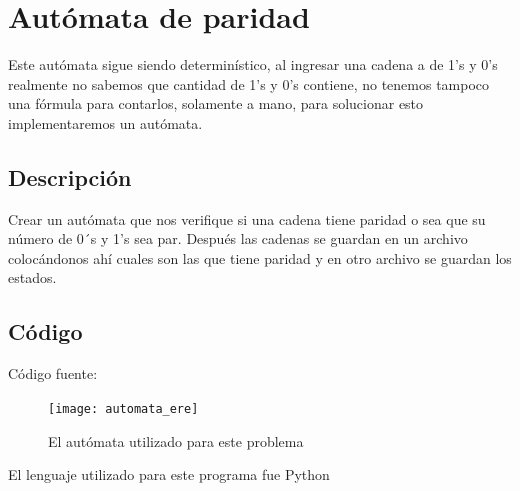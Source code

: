 \documentclass[12pt]{article}
\begin{document}
\section{Autómata de paridad}
Este autómata sigue siendo determinístico, al ingresar una cadena a de 1's y 0's realmente no sabemos que cantidad de 1's y 0's contiene, no tenemos tampoco una fórmula para contarlos, solamente a mano, para solucionar esto implementaremos un autómata.

\subsection{Descripción }
Crear un autómata que nos verifique si una cadena tiene paridad o sea que su número de 0´s y 1's sea par. Después las cadenas se guardan en un archivo colocándonos ahí cuales son las que tiene paridad y en otro archivo se guardan los estados.


\subsection{Código}
Código fuente:

\begin{figure}[H]
\texttt{[image: automata\_ere]}
\caption{El autómata utilizado para este problema}
\label{fig:automata paridad}
\end{figure}

El lenguaje utilizado para este programa fue Python\\
\end{document}
